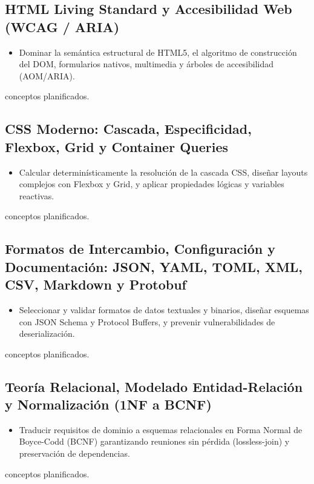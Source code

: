 \documentclass{book}
\begin{document}
\subsection*{\checkmark HTML Living Standard y Accesibilidad Web (WCAG / ARIA)}
\begin{itemize}
\item Dominar la semántica estructural de HTML5, el algoritmo de construcción del DOM, formularios nativos, multimedia y árboles de accesibilidad (AOM/ARIA).
\end{itemize}
 conceptos planificados.

\subsection*{\checkmark CSS Moderno: Cascada, Especificidad, Flexbox, Grid y Container Queries}
\begin{itemize}
\item Calcular determinísticamente la resolución de la cascada CSS, diseñar layouts complejos con Flexbox y Grid, y aplicar propiedades lógicas y variables reactivas.
\end{itemize}
 conceptos planificados.

\subsection*{\checkmark Formatos de Intercambio, Configuración y Documentación: JSON, YAML, TOML, XML, CSV, Markdown y Protobuf}
\begin{itemize}
\item Seleccionar y validar formatos de datos textuales y binarios, diseñar esquemas con JSON Schema y Protocol Buffers, y prevenir vulnerabilidades de deserialización.
\end{itemize}
 conceptos planificados.

\subsection*{\checkmark Teoría Relacional, Modelado Entidad-Relación y Normalización (1NF a BCNF)}
\begin{itemize}
\item Traducir requisitos de dominio a esquemas relacionales en Forma Normal de Boyce-Codd (BCNF) garantizando reuniones sin pérdida (lossless-join) y preservación de dependencias.
\end{itemize}
 conceptos planificados.
\end{document}
